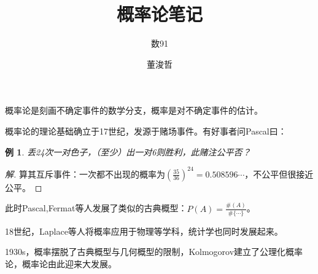\documentclass{ctexbook}
\title{概率论笔记}
\author{数91\and 董浚哲}
\begin{document}
\maketitle
\newcommand{\R}{\mathbb{R}}
\newcommand{\N}{\mathbb{N}}
\newcommand{\dd}{\,\mathrm{d}}
\newcommand{\st}{\text{ s.t. }}
\newcommand{\pp}[2]{\frac{\partial #1}{\partial #2}}
\newcommand{\dif}[2]{\frac{\mathrm{d}#1}{\mathrm{d}#2}}
\newcommand{\nm}[1]{\left\|#1\right\|}
\newcommand{\dual}[1]{\left<#1\right>}
\newcommand{\wto}{\rightharpoonup}
\newcommand{\wsto}{\stackrel{*}{\rightharpoonup}}
\newcommand{\cvin}{\text{ in }}
\newcommand{\alev}{\text{ a.e. }}
\newcommand{\alsu}{\text{ a.s. }}
\newcommand{\E}{\mathcal{E}}
\newcommand{\F}{\mathscr{F}}
\newcommand{\G}{\mathscr{G}}
\newcommand{\Bor}{\mathscr{B}}
\newcommand{\pw}{\text{ p.w. }}
\newcommand{\inof}{\text{ i.o. }}
\newcommand{\X}{\bm{X}}
\newcommand{\iid}{\mathrm{i.i.d.}~}
\newcommand{\C}{\mathbb{C}}

\newtheorem{Thm}{定理}[section]
\newtheorem{Lemma}[Thm]{引理}
\newtheorem{Prop}[Thm]{命题}
\newtheorem{Cor}[Thm]{推论}
\newtheorem{Def}{定义}[section]
\newtheorem{Rmk}{注}[section]
\newtheorem{Eg}{例}[section]
概率论是刻画不确定事件的数学分支，概率是对不确定事件的估计。

概率论的理论基础确立于17世纪，发源于赌场事件。有好事者问Pascal曰：
\begin{Eg}
  丢24次一对色子，（至少）出一对6则胜利，此赌注公平否？
\end{Eg}
\begin{proof}[解]
  算其互斥事件：一次都不出现的概率为$(\frac{35}{36})^{24}=0.508596\cdots$，不公平但很接近公平。
\end{proof}

此时Pascal,Fermat等人发展了类似的古典概型：$P(A)=\frac{\#(A)}{\#\{\cdots\}}$。

18世纪，Laplace等人将概率应用于物理等学科，统计学也同时发展起来。

1930s，概率摆脱了古典概型与几何概型的限制，Kolmogorov建立了公理化概率论，概率论由此迎来大发展。





\end{document}
